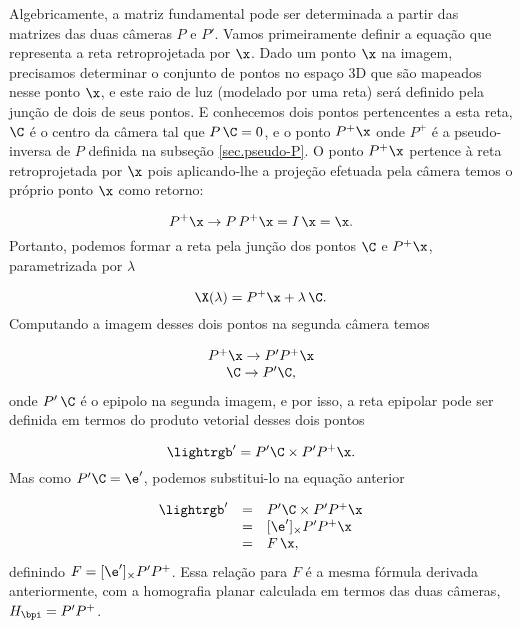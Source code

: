 Algebricamente, a matriz fundamental pode ser determinada a partir das matrizes das duas câmeras $P$ e $P'$. Vamos primeiramente definir a equação que representa a reta retroprojetada por $\x$. Dado um ponto $\x$ na imagem, precisamos determinar o conjunto de pontos no espaço 3D que são mapeados nesse ponto $\x$, e este raio de luz (modelado por uma reta) será definido pela junção de dois de seus pontos. E conhecemos dois pontos pertencentes a esta reta, $\C$ é o centro da câmera tal que $P\,\C=0$, e o ponto $P^+\x$ onde $P^+$ é a pseudo-inversa de $P$ definida na subseção \ref{sec.pseudo-P}. O ponto $P^+\x$ pertence à reta retroprojetada por $\x$ pois aplicando-lhe a projeção efetuada pela câmera temos o próprio ponto $\x$ como retorno:

\begin{equation*}
P^+\x \rightarrow P\,P^+\x=I\,\x=\x.
\end{equation*}
Portanto, podemos formar a reta pela junção dos pontos $\C$ e $P^+\x$, parametrizada por $\lambda$

\begin{equation*}
\X(\lambda)=P^+\x+\lambda\,\C.
\end{equation*}
Computando a imagem desses dois pontos na segunda câmera temos

\begin{equation*}
\begin{array}{c}
P^+\x \rightarrow P'P^+\x\\
\C \rightarrow P'\C,
\end{array}
\end{equation*}
onde $P'\,\C$ é o epipolo na segunda imagem, e por isso, a reta epipolar pode ser definida em termos do produto vetorial desses dois pontos

\begin{equation}\label{eq.reta-epipolar-funcao-cameras}
\lightrgb'=P'\C \times P'P^+\x.
\end{equation}
Mas como $P'\C=\e'$, podemos substitui-lo na equação anterior

\begin{equation*}
\begin{array}{rcl}
\lightrgb'&=&P'\C \times P'P^+\x\\
&=&[\e']_\times P'P^+\x\\
&=&F\,\x,
\end{array}
\end{equation*}
definindo $F=[\e']_\times P'P^+$. Essa relação para $F$ é a mesma fórmula derivada anteriormente, com a homografia planar calculada em termos das duas câmeras, $H_{\bpi}=P'P^+$.


